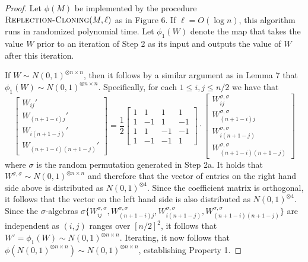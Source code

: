 \begin{proof}
Let $\phi(M)$ be implemented by the procedure $\textsc{Reflection-Cloning}(M, \ell)$ as in Figure 6. If $\ell = O(\log n)$, this algorithm runs in randomized polynomial time. Let $\phi_1(W)$ denote the map that takes the value $W$ prior to an iteration of Step 2 as its input and outputs the value of $W$ after this iteration.

If $W \sim N(0, 1)^{\otimes n \times n}$, then it follows by a similar argument as in Lemma 7 that $\phi_1(W) \sim N(0, 1)^{\otimes n \times n}$. Specifically, for each $1 \le i, j \le n/2$ we have that
$$\left[ \begin{matrix} W_{ij}' \\ W_{(n+1-i)j}' \\ W_{i(n+1-j)}' \\ W_{(n+1-i)(n+1-j)}' \end{matrix} \right] = \frac{1}{2} \left[ \begin{array}{rrrr} 1 & 1 & 1 & 1 \\ 1 & -1 & 1 & -1 \\ 1 & 1 & -1 & -1 \\ 1 & -1 & -1 & 1 \end{array} \right] \cdot \left[ \begin{matrix} W_{ij}^{\sigma, \sigma} \\ W_{(n+1-i)j}^{\sigma, \sigma} \\ W_{i(n+1-j)}^{\sigma, \sigma} \\ W_{(n+1-i)(n+1-j)}^{\sigma, \sigma} \end{matrix} \right]$$
where $\sigma$ is the random permutation generated in Step 2a. It holds that $W^{\sigma, \sigma} \sim N(0, 1)^{\otimes n \times n}$ and therefore that the vector of entries on the right hand side above is distributed as $N(0, 1)^{\otimes 4}$. Since the coefficient matrix is orthogonal, it follows that the vector on the left hand side is also distributed as $N(0, 1)^{\otimes 4}$. Since the $\sigma$-algebras $\sigma\{W_{ij}^{\sigma, \sigma}, W_{(n+1-i)j}^{\sigma, \sigma}, W_{i(n+1-j)}^{\sigma, \sigma}, W_{(n+1-i)(n+1-j)}^{\sigma, \sigma} \}$ are independent as $(i, j)$ ranges over $[n/2]^2$, it follows that $W' = \phi_1(W) \sim N(0, 1)^{\otimes n \times n}$. Iterating, it now follows that $\phi(N(0, 1)^{\otimes n \times n}) \sim N(0, 1)^{\otimes n \times n}$, establishing Property 1.


\end{proof}
